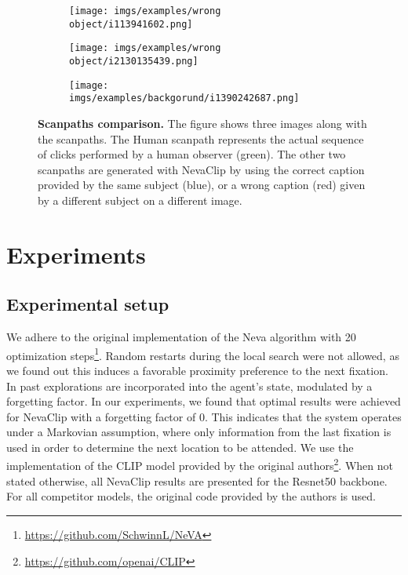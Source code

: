 \documentclass{article}
\begin{document}
\begin{figure}[t]

  \centering
  
  \begin{subfigure}[t]{0.33\textwidth}
  \texttt{[image: imgs/examples/wrong object/i113941602.png]}
  \end{subfigure}\hfill
  \begin{subfigure}[t]{0.33\textwidth}
  \texttt{[image: imgs/examples/wrong object/i2130135439.png]}
  \end{subfigure}\hfill
  \begin{subfigure}[t]{0.33\textwidth}
  \texttt{[image: imgs/examples/backgorund/i1390242687.png]}
  \end{subfigure}
  \caption{\textbf{Scanpaths comparison. }The figure shows three images along with the scanpaths. The Human scanpath represents the actual sequence of clicks performed by a human observer (green). The other two scanpaths are generated with NevaClip by using the correct caption provided by the same subject (blue), or a wrong caption (red) given by a different subject on a different image.
}
  \label{fig:scanpaths_examples}
\end{figure}



\section{Experiments}

\subsection{Experimental setup}
We adhere to the original implementation of the Neva algorithm with 20 optimization steps\footnote{\url{https://github.com/SchwinnL/NeVA}}. Random restarts during the local search were not allowed, as we found out this induces a favorable proximity preference \citep{koch1987shifts} to the next fixation.  In \citep{schwinn2022behind} past explorations are incorporated into the agent's state, modulated by  a forgetting factor. In our experiments, we found that optimal results were achieved for NevaClip with a forgetting factor of $0$. This indicates that the system operates under a Markovian assumption, where only information from the last fixation is used in order to determine the next location to be attended. We use the implementation of the CLIP model provided by the original authors\footnote{\url{https://github.com/openai/CLIP}}. When not stated otherwise, all NevaClip results are presented for the Resnet50 backbone.  For all  competitor models, the original code provided by the authors is used. 
\end{document}
